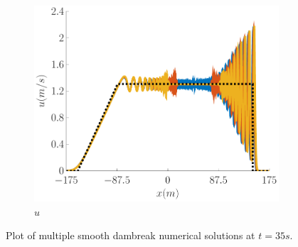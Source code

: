\documentclass[10pt]{article}
\begin{document}
\begin{figure}
\begin{subfigure}{0.32\textwidth}
	\centering
	\includegraphics[width=\textwidth]{./Figures/Simulations/Study/ImpDisp/u.pdf}
	\caption{$u$}
	\end{subfigure}
	\caption{Plot of multiple smooth dambreak numerical solutions at $t=35s$.}
\end{figure}
\end{document}
